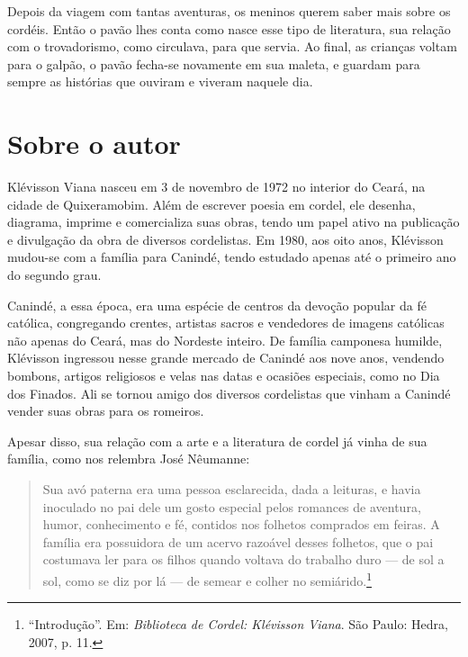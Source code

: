 \documentclass[11pt]{extarticle}
\begin{document}
Depois da viagem com tantas aventuras, os meninos querem saber mais sobre os cordéis. Então o pavão lhes conta como nasce esse tipo de literatura, sua relação com o trovadorismo, como circulava, para que servia. Ao final, as crianças voltam para o galpão, o pavão fecha-se novamente em sua maleta, e guardam para sempre as histórias que ouviram e viveram naquele dia.


\reversemarginpar
\marginparwidth=5cm



\section{Sobre o autor}


Klévisson Viana nasceu em 3 de novembro de 1972 no interior do Ceará, na cidade de Quixeramobim. Além de escrever poesia em cordel, ele desenha, diagrama, imprime e comercializa suas obras, tendo um papel ativo na publicação e divulgação da obra de diversos cordelistas. Em 1980, aos oito anos, Klévisson mudou-se com a família para Canindé, tendo estudado apenas até o primeiro ano do segundo grau.

Canindé, a essa época, era uma espécie de centros da devoção popular da fé católica, congregando crentes, artistas sacros e vendedores de imagens católicas não
apenas do Ceará, mas do Nordeste inteiro. De família camponesa humilde, Klévisson ingressou nesse grande mercado de Canindé aos nove anos, vendendo bombons, artigos religiosos e velas nas datas e ocasiões especiais, como no Dia dos Finados.
Ali se tornou amigo dos diversos cordelistas que vinham a Canindé vender suas obras para os romeiros.

Apesar disso, sua relação com a arte e a literatura de cordel já vinha de sua família, como nos relembra José Nêumanne:

\begin{quote}
Sua avó paterna era uma pessoa esclarecida, dada a leituras, e havia inoculado no pai dele um gosto especial pelos romances de aventura, humor, conhecimento e fé, contidos nos folhetos comprados em feiras. A família era possuidora de um acervo razoável desses folhetos, que o pai costumava ler para os filhos quando voltava do trabalho duro --- de sol a sol, como se diz por lá --- de semear e colher no semiárido.\footnote{``Introdução''. Em: \textit{Biblioteca de Cordel: Klévisson Viana}. São Paulo: Hedra, 2007, p. 11.}
\end{quote}
\end{document}
